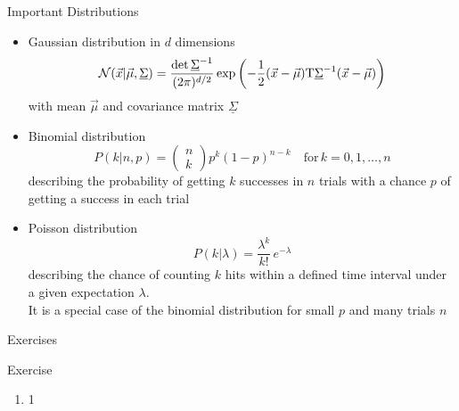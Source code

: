   \begin{frame}{Important Distributions}
    \begin{itemize}
      \item Gaussian distribution in $d$ dimensions
        \begin{equation*}
          \mathcal{N}(\vec{x}|\vec{\mu},\underline{\Sigma})
          = \frac{\det{\underline{\Sigma}^{-1}}}{(2\pi)^{d/2}}
            \exp\left(
              -\frac{1}{2} (\vec{x}-\vec{\mu})\text{T}
              \underline{\Sigma}^{-1} (\vec{x}-\vec{\mu})
            \right)
        \end{equation*}
        with mean $\vec{\mu}$ and covariance matrix $\underline{\Sigma}$
      \item Binomial distribution
        \begin{equation*}
          P(k|n,p) = \begin{pmatrix} n \\ k \end{pmatrix} p^k (1-p)^{n-k}
          \quad\text{for}\, k = 0, 1, \dots, n
        \end{equation*}
        describing the probability of getting $k$ successes in $n$ trials with a chance $p$ of getting a success in each trial
      \item Poisson distribution
      \begin{equation*}
        P(k|\lambda) = \frac{\lambda^k}{k!}\,e^{-\lambda}
      \end{equation*}
      describing the chance of counting $k$ hits within a defined time interval under a given expectation $\lambda$.\\
      It is a special case of the binomial distribution for small $p$ and many trials $n$
    \end{itemize}
  \end{frame}

  \begin{frame}{Exercises}
    \begin{exampleblock}{Exercise}
      \begin{enumerate}
        \item 1
      \end{enumerate}
    \end{exampleblock}
  \end{frame}

